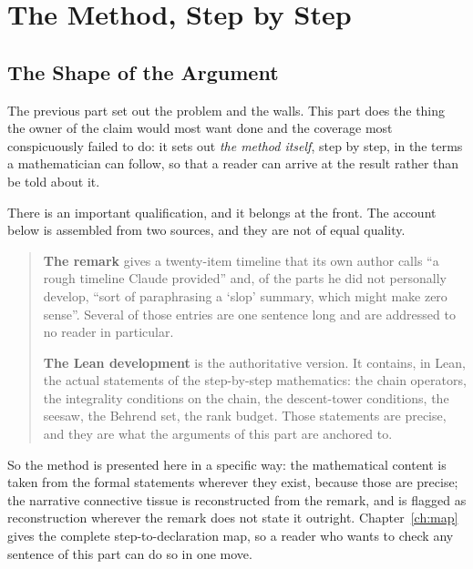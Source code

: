 \part{The Method, Step by Step}
\label{part:method}

\chapter{The Shape of the Argument}
\label{ch:shape}

The previous part set out the problem and the walls. This part does the thing
the owner of the claim would most want done and the coverage most conspicuously
failed to do: it sets out \emph{the method itself}, step by step, in the terms a
mathematician can follow, so that a reader can arrive at the result rather than
be told about it.

There is an important qualification, and it belongs at the front. The account
below is assembled from two sources, and they are not of equal quality.

\begin{quote}
\textbf{The remark} gives a twenty-item timeline that its own author calls ``a
rough timeline Claude provided'' and, of the parts he did not personally
develop, ``sort of paraphrasing a `slop' summary, which might make zero sense''.
Several of those entries are one sentence long and are addressed to no reader in
particular.

\textbf{The Lean development} is the authoritative version. It contains, in
Lean, the actual statements of the step-by-step mathematics: the chain
operators, the integrality conditions on the chain, the descent-tower
conditions, the seesaw, the Behrend set, the rank budget. Those statements are
precise, and they are what the arguments of this part are anchored to.
\end{quote}

So the method is presented here in a specific way: the mathematical content is
taken from the formal statements wherever they exist, because those are
precise; the narrative connective tissue is reconstructed from the remark, and
is flagged as reconstruction wherever the remark does not state it outright.
Chapter~\ref{ch:map} gives the complete step-to-declaration map, so a reader
who wants to check any sentence of this part can do so in one move.

